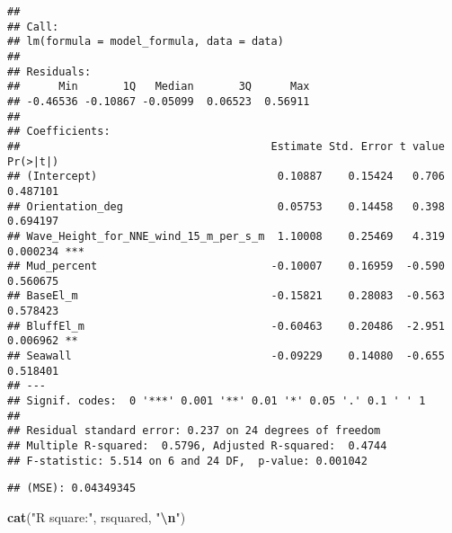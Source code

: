 \documentclass[
]{article}
\newenvironment{Shaded}{\begin{snugshade}}{\end{snugshade}}
\newcommand{\DecValTok}[1]{\textcolor[rgb]{0.00,0.00,0.81}{#1}}
\newcommand{\FunctionTok}[1]{\textcolor[rgb]{0.13,0.29,0.53}{\textbf{#1}}}
\newcommand{\NormalTok}[1]{#1}
\newcommand{\OtherTok}[1]{\textcolor[rgb]{0.56,0.35,0.01}{#1}}
\newcommand{\SpecialCharTok}[1]{\textcolor[rgb]{0.81,0.36,0.00}{\textbf{#1}}}
\newcommand{\StringTok}[1]{\textcolor[rgb]{0.31,0.60,0.02}{#1}}
\begin{document}
\begin{verbatim}
## 
## Call:
## lm(formula = model_formula, data = data)
## 
## Residuals:
##      Min       1Q   Median       3Q      Max 
## -0.46536 -0.10867 -0.05099  0.06523  0.56911 
## 
## Coefficients:
##                                       Estimate Std. Error t value Pr(>|t|)    
## (Intercept)                            0.10887    0.15424   0.706 0.487101    
## Orientation_deg                        0.05753    0.14458   0.398 0.694197    
## Wave_Height_for_NNE_wind_15_m_per_s_m  1.10008    0.25469   4.319 0.000234 ***
## Mud_percent                           -0.10007    0.16959  -0.590 0.560675    
## BaseEl_m                              -0.15821    0.28083  -0.563 0.578423    
## BluffEl_m                             -0.60463    0.20486  -2.951 0.006962 ** 
## Seawall                               -0.09229    0.14080  -0.655 0.518401    
## ---
## Signif. codes:  0 '***' 0.001 '**' 0.01 '*' 0.05 '.' 0.1 ' ' 1
## 
## Residual standard error: 0.237 on 24 degrees of freedom
## Multiple R-squared:  0.5796, Adjusted R-squared:  0.4744 
## F-statistic: 5.514 on 6 and 24 DF,  p-value: 0.001042
\end{verbatim}

\begin{Shaded}
\end{Shaded}

\begin{verbatim}
## (MSE): 0.04349345
\end{verbatim}

\begin{Shaded}
\begin{Highlighting}[]
\FunctionTok{cat}\NormalTok{(}\StringTok{"R square:"}\NormalTok{, rsquared, }\StringTok{"}\SpecialCharTok{\textbackslash{}n}\StringTok{"}\NormalTok{)}
\end{Highlighting}
\end{Shaded}
\end{document}

